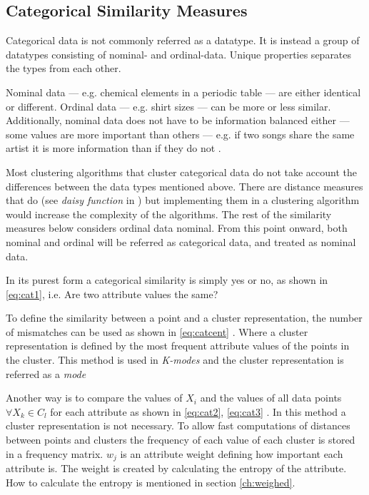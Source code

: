 \documentclass[../report.tex]{subfiles}
\begin{document}
\subsection{Categorical Similarity Measures}
Categorical data is not commonly referred as a datatype. It is instead a group of datatypes consisting of nominal- and ordinal-data. Unique properties separates the types from each other.

Nominal data --- e.g. chemical elements in a periodic table  --- are either identical or different. Ordinal data --- e.g. shirt sizes --- can be more or less similar. Additionally, nominal data does not have to be information balanced either --- some values are more important than others --- e.g. if two songs share the same artist it is more information than if they do not \cite{Kaufman1990}.

Most clustering algorithms that cluster categorical data do not take account the differences between the data types mentioned above. There are distance measures that do (see \textit{daisy function} in \cite{Kaufman1990}) but implementing them in a clustering algorithm would increase the complexity of the algorithms. The rest of the similarity measures below considers ordinal data nominal. From this point onward, both nominal and ordinal will be referred as categorical data, and treated as nominal data.

In its purest form a categorical similarity is simply yes or no, as shown in \ref{eq:cat1}, i.e. Are two attribute values the same? \cite{Guha2000, Kaufman1990}

To define the similarity between a point and a cluster representation, the number of mismatches can be used as shown in \ref{eq:catcent} \cite{Ng1999,Huang97clusteringlarge}. Where a cluster representation is defined by the most frequent attribute values of the points in the cluster. This method is used in \textit{K-modes} and the cluster representation is referred as a \textit{mode}

Another way is to compare the values of $X_i$ and the values of all data points $\forall X_k \in C_l$ for each attribute as shown in \ref{eq:cat2}, \ref{eq:cat3} \cite{Guha2000, Cheung2013}. In this method a cluster representation is not necessary. To allow fast computations of distances between points and clusters the frequency of each value of each cluster is stored in a frequency matrix. $w_j$ is an attribute weight defining how important each attribute is. The weight is created by calculating the entropy of the attribute. How to calculate the entropy is mentioned in section \ref{ch:weighed}.
\end{document}
